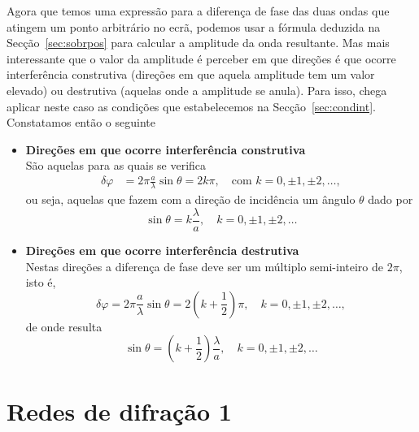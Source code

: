 Agora que temos uma expressão para a diferença de fase das duas ondas que
atingem um ponto arbitrário no ecrã, podemos usar a fórmula deduzida na
Secção~\ref{sec:sobrpos} para calcular a amplitude da onda resultante. Mas
mais interessante que o valor da amplitude é perceber em que direções é que
ocorre interferência construtiva (direções em que aquela amplitude tem um valor
elevado) ou destrutiva (aquelas onde a amplitude se anula). Para isso, chega
aplicar neste caso as condições que estabelecemos na Secção~\ref{sec:condint}.
Constatamos então o seguinte
\begin{itemize}
\item
    \textbf{Direções em que ocorre interferência construtiva}\\
    São aquelas para as quais se verifica
    \begin{align*}
    \delta\varphi &= 2\pi\frac{a}{\lambda}\sin\theta=
                    2k\pi,\quad\text{com }k=0,\pm1,\pm2,\ldots,
    \end{align*}
    ou seja, aquelas que fazem com a direção de incidência um ângulo $\theta$
    dado por
    \begin{equation*}
        \sin\theta=k\frac\lambda a,\quad k=0,\pm1,\pm2,\ldots
    \end{equation*}
\item
    \textbf{Direções em que ocorre interferência destrutiva}\\
    Nestas direções a diferença de fase deve ser um múltiplo semi-inteiro de
    $2\pi$, isto é,
    \begin{equation*}
        \delta\varphi=2\pi\frac{a}{\lambda}\sin\theta=2\left(k+\frac12\right)
        \pi,\quad k=0,\pm1,\pm2,\ldots,
    \end{equation*}
    de onde resulta
    \begin{equation*}
        \sin\theta=\left(k+\frac12\right)\frac\lambda a,\quad
        k=0,\pm1,\pm2,\ldots
    \end{equation*}
\end{itemize}

\pagebreak

\section{Redes de difração 1} 
\tobedone{}

